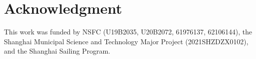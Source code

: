 \documentclass[10pt,journal,compsoc]{IEEEtran}
\begin{document}
\section*{Acknowledgment}
\fi

This work was funded by NSFC (U19B2035, U20B2072, 61976137, 62106144), the Shanghai Municipal Science and Technology Major Project (2021SHZDZX0102), and the Shanghai Sailing Program.






\ifCLASSOPTIONcaptionsoff
  \newpage
\fi











\end{document}
